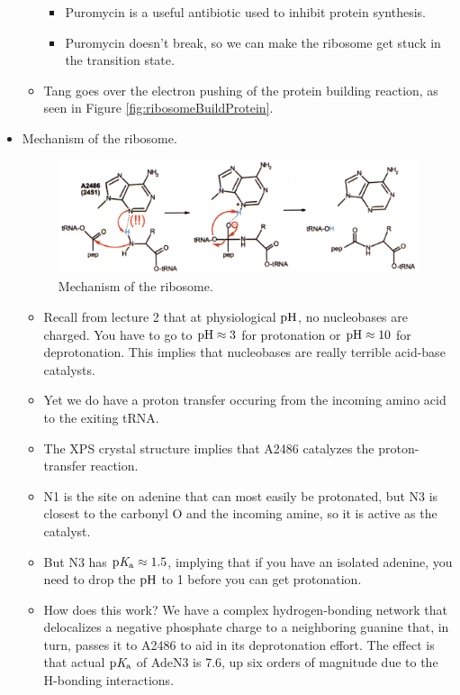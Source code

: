\documentclass[../notes.tex]{subfiles}
\begin{document}
\begin{itemize}
\begin{itemize}
        \begin{itemize}
            \item Puromycin is a useful antibiotic used to inhibit protein synthesis.
            \item Puromycin doesn't break, so we can make the ribosome get stuck in the transition state.
        \end{itemize}
        \item Tang goes over the electron pushing of the protein building reaction, as seen in Figure \ref{fig:ribosomeBuildProtein}.
    \end{itemize}
    \item Mechanism of the ribosome.
    \begin{figure}[h!]
        \centering
        \includegraphics[width=0.7\linewidth]{../ExtFiles/ribosomeMechanism.png}
        \caption{Mechanism of the ribosome.}
        \label{fig:ribosomeMechanism}
    \end{figure}
    \begin{itemize}
        \item Recall from lecture 2 that at physiological $\operatorname{pH}$, no nucleobases are charged. You have to go to $\operatorname{pH}\approx 3$ for protonation or $\operatorname{pH}\approx 10$ for deprotonation. This implies that nucleobases are really terrible acid-base catalysts.
        \item Yet we do have a proton transfer occuring from the incoming amino acid to the exiting tRNA.
        \item The XPS crystal structure implies that A2486 catalyzes the proton-transfer reaction.
        \item N1 is the site on adenine that can most easily be protonated, but N3 is closest to the carbonyl O and the incoming amine, so it is active as the catalyst.
        \item But N3 has $\operatorname{p\textit{K}_a}\approx 1.5$, implying that if you have an isolated adenine, you need to drop the $\operatorname{pH}$ to 1 before you can get protonation.
        \item How does this work? We have a complex hydrogen-bonding network that delocalizes a negative phosphate charge to a neighboring guanine that, in turn, passes it to A2486 to aid in its deprotonation effort. The effect is that actual $\operatorname{p\textit{K}_a}$ of AdeN3 is 7.6, up six orders of magnitude due to the H-bonding interactions.

\end{itemize}
\end{itemize}
\end{document}
